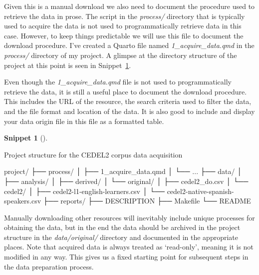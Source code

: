 \documentclass[
  letterpaper,
  krantz1]{latex/krantz-mod}
\newenvironment{Shaded}{\begin{snugshade}}{\end{snugshade}}
\newcommand{\ExtensionTok}[1]{\textcolor[rgb]{0.00,0.00,0.00}{#1}}
\newcommand{\NormalTok}[1]{\textcolor[rgb]{0.00,0.00,0.00}{#1}}
\theoremstyle{definition}
\theoremstyle{definition}
\newtheorem{definition}{Snippet}[chapter]
\theoremstyle{remark}
\begin{document}
Given this is a manual download we also need to document the procedure
used to retrieve the data in prose. The script in the \emph{process/}
directory that is typically used to acquire the data is not used to
programmatically retrieve data in this case. However, to keep things
predictable we will use this file to document the download procedure.
I've created a Quarto file named \emph{1\_acquire\_data.qmd} in the
\emph{process/} directory of my project. A glimpse at the directory
structure of the project at this point is seen in
Snippet~\ref{def-acquire-cedel2-structure}.

Even though the \emph{1\_acquire\_data.qmd} file is not used to
programmatically retrieve the data, it is still a useful place to
document the download procedure. This includes the URL of the resource,
the search criteria used to filter the data, and the file format and
location of the data. It is also good to include and display your data
origin file in this file as a formatted table.

\pagebreak

\begin{definition}[]\protect\hypertarget{def-acquire-cedel2-structure}{}\label{def-acquire-cedel2-structure}

Project structure for the CEDEL2 corpus data acquisition

\begin{Shaded}
\begin{Highlighting}[]
\ExtensionTok{project/}
\ExtensionTok{├──}\NormalTok{ process/}
\ExtensionTok{│}\NormalTok{   ├── 1\_acquire\_data.qmd}
\ExtensionTok{│}\NormalTok{   └── ...}
\ExtensionTok{├──}\NormalTok{ data/}
\ExtensionTok{│}\NormalTok{   ├── analysis/}
\ExtensionTok{│}\NormalTok{   ├── derived/}
\ExtensionTok{│}\NormalTok{   └── original/}
\ExtensionTok{│}\NormalTok{       ├── cedel2\_do.csv}
\ExtensionTok{│}\NormalTok{       └── cedel2/}
\ExtensionTok{│}\NormalTok{           ├── cedel2{-}l1{-}english{-}learners.csv}
\ExtensionTok{│}\NormalTok{           └── cedel2{-}native{-}spanish{-}speakers.csv}
\ExtensionTok{├──}\NormalTok{ reports/}
\ExtensionTok{├──}\NormalTok{ DESCRIPTION}
\ExtensionTok{├──}\NormalTok{ Makefile}
\ExtensionTok{└──}\NormalTok{ README}
\end{Highlighting}
\end{Shaded}

\end{definition}

Manually downloading other resources will inevitably include unique
processes for obtaining the data, but in the end the data should be
archived in the project structure in the \emph{data/original/} directory
and documented in the appropriate places. Note that acquired data is
always treated as `read-only', meaning it is not modified in any way.
This gives us a fixed starting point for subsequent steps in the data
preparation process.
\end{document}
